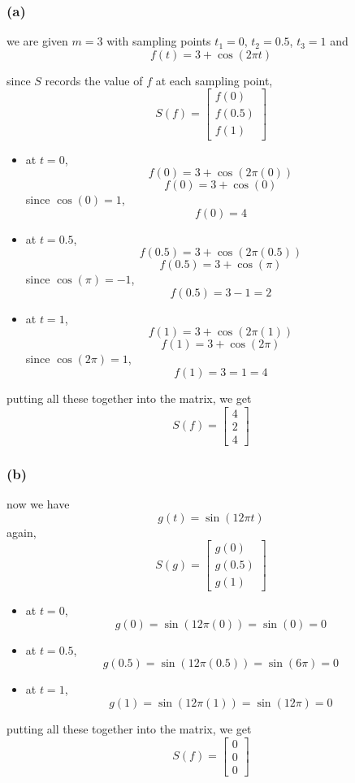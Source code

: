 \documentclass{article}
\begin{document}
\subsubsection*{(a)}
we are given $m=3$ with sampling points $t_1=0$, $t_2=0.5$, $t_3=1$ and 
$$f(t) = 3+\cos(2\pi t)$$

since $S$ records the value of $f$ at each sampling point,
\[
S(f)=
\begin{bmatrix}
    f(0) \\
    f(0.5) \\
    f(1)
\end{bmatrix}
\]
\begin{itemize}
    \item at $t=0$, $$f(0) = 3+\cos(2\pi(0))$$ $$f(0)=3+\cos(0)$$
    since $\cos(0)=1$, $$f(0) = 4$$
    \item at $t=0.5$, $$f(0.5) = 3+\cos(2\pi(0.5))$$ $$f(0.5)=3+\cos(\pi)$$
    since $\cos(\pi)=-1$, $$f(0.5) = 3-1=2$$
    \item at $t=1$, $$f(1) = 3+\cos(2\pi(1))$$ $$f(1)=3+\cos(2\pi)$$
    since $\cos(2\pi)=1$, $$f(1) = 3=1=4$$
\end{itemize}

putting all these together into the matrix, we get
\[
\boxed{
    S(f) = 
    \begin{bmatrix}
        4\\
        2\\
        4
    \end{bmatrix}
}
\]

\subsubsection*{(b)}
now we have $$g(t) = \sin(12\pi t)$$
again,
\[
S(g) = 
\begin{bmatrix}
    g(0)\\
    g(0.5)\\
    g(1)
\end{bmatrix}
\]

\begin{itemize}
    \item at $t=0$, $$g(0)=\sin(12\pi(0))=\sin(0) = 0$$
    \item at $t=0.5$, $$g(0.5)=\sin(12\pi(0.5))=\sin(6\pi) = 0$$
    \item at $t=1$, $$g(1)=\sin(12\pi(1))=\sin(12\pi) = 0$$
\end{itemize}

putting all these together into the matrix, we get
\[
\boxed{
    S(f) = 
    \begin{bmatrix}
        0\\
        0\\
        0
    \end{bmatrix}
}
\]
\end{document}
